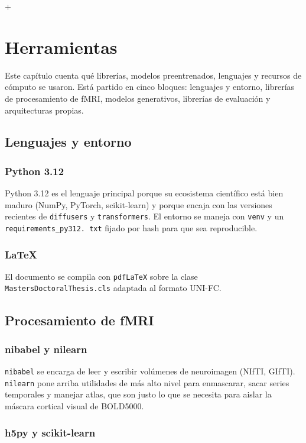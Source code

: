 +\chapter{Herramientas}

Este capítulo cuenta qué librerías, modelos preentrenados, lenguajes y
recursos de cómputo se usaron. Está partido en cinco bloques: lenguajes y
entorno, librerías de procesamiento de fMRI, modelos generativos, librerías de
evaluación y arquitecturas propias.

\section{Lenguajes y entorno}

\subsection{Python 3.12}

Python 3.12 es el lenguaje principal porque su ecosistema científico está bien maduro (NumPy, 
PyTorch, scikit-learn) y porque encaja con las versiones recientes de \texttt{diffusers} y 
\texttt{transformers}. El entorno se maneja con \texttt{venv} y un \texttt{requirements\_py312.
txt} fijado por hash para que sea reproducible.

\subsection{LaTeX}

El documento se compila con \texttt{pdfLaTeX} sobre la clase \texttt{MastersDoctoralThesis.cls} 
adaptada al formato UNI-FC.

\section{Procesamiento de fMRI}

\subsection{nibabel y nilearn}

\texttt{nibabel} se encarga de leer y escribir volúmenes de neuroimagen (NIfTI, GIfTI). 
\texttt{nilearn} pone arriba utilidades de más alto nivel para enmascarar, sacar series 
temporales y manejar atlas, que son justo lo que se necesita para aislar la máscara cortical 
visual de BOLD5000.

\subsection{h5py y scikit-learn}

